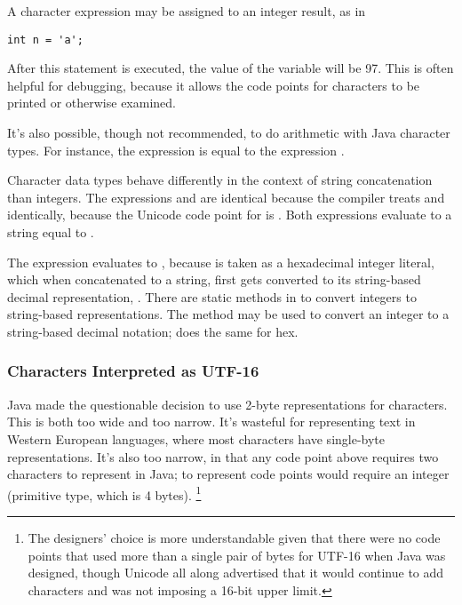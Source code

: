 A character expression may be assigned to an integer result, as in
%
\begin{verbatim}
int n = 'a';
\end{verbatim}
%
After this statement is executed, the value of the variable 
will be 97.  This is often helpful for debugging, because it allows
the code points for characters to be printed or otherwise examined.

It's also possible, though not recommended, to do arithmetic with Java
character types.  For instance, the expression  is equal
to the expression .

Character data types behave differently in the context of string
concatenation than integers.  The expressions  and
 are identical because the compiler treats
 and  identically, because the Unicode
code point for  is .  Both expressions
evaluate to a string equal to .  

The expression  evaluates to ,
because  is taken as a hexadecimal integer literal, which
when concatenated to a string, first gets converted to its
string-based decimal representation, .  There are static methods in
 to convert integers to string-based
representations.  The method  may be used
to convert an integer to a string-based decimal notation;
 does the same for hex.

\subsubsection{Characters Interpreted as UTF-16}

Java made the questionable decision to use 2-byte representations for
characters.  This is both too wide and too narrow.  It's wasteful for
representing text in Western European languages, where most characters
have single-byte representations.  It's also too narrow, in that
any code point above  requires two characters to
represent in Java; to represent code points would require an
integer (primitive  type, which is 4 bytes).
%
\footnote{The designers' choice is more understandable given that there were no
code points that used more than a single pair of bytes for UTF-16 when
Java was designed, though Unicode all along advertised that it would
continue to add characters and was not imposing a 16-bit upper limit.}

